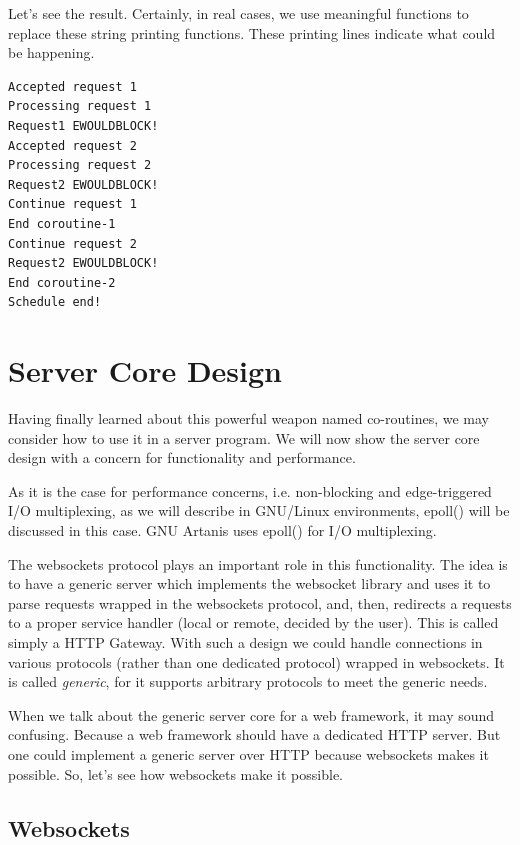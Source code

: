 \documentclass[numbers,numberedpars]{sigplanconf}
\begin{document}


Let's see the result. Certainly, in real cases, we use meaningful functions to replace these string printing functions. These printing lines indicate what could be happening.

\begin{lstlisting}[caption=Coroutines running result]
Accepted request 1
Processing request 1
Request1 EWOULDBLOCK!
Accepted request 2
Processing request 2
Request2 EWOULDBLOCK!
Continue request 1
End coroutine-1
Continue request 2
Request2 EWOULDBLOCK!
End coroutine-2
Schedule end!
\end{lstlisting}

\section{Server Core Design}

Having finally learned about this powerful weapon named co-routines, we may consider how to use it in a server program. We will now show the server core design with a concern for functionality and performance.

As it is the case for performance concerns, i.e. non-blocking and edge-triggered I/O multiplexing, as we will describe in GNU/Linux environments, epoll() will be discussed in this case. GNU Artanis uses epoll() for I/O multiplexing.

The websockets protocol plays an important role in this functionality. The idea is to have a generic server which implements the websocket library and uses it to parse requests wrapped in the websockets protocol, and, then, redirects a requests to a proper service handler (local or remote, decided by the user). This is called simply a HTTP Gateway. With such a design we could handle connections in various protocols (rather than one dedicated protocol) wrapped in websockets. It is called {\it generic}, for it supports arbitrary protocols to meet the generic needs.

When we talk about the generic server core for a web framework, it may sound confusing. Because a web framework should have a dedicated HTTP server. But one could implement a generic server over HTTP because websockets makes it possible. So, let's see how websockets make it possible.

\subsection{Websockets} \label{Websockets}
\end{document}
